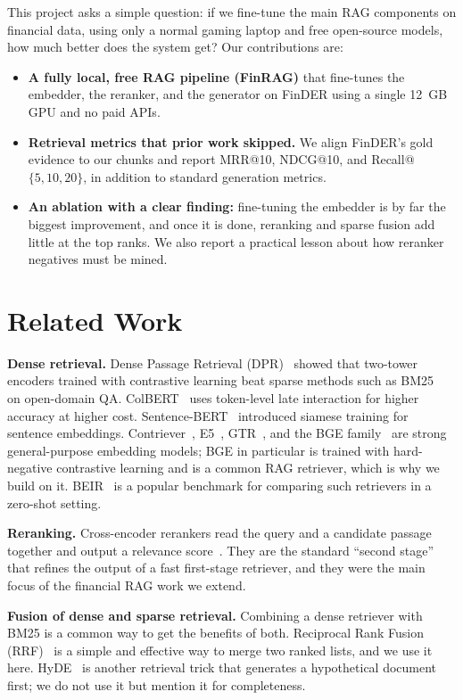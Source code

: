 \documentclass[conference]{IEEEtran}
\begin{document}
This project asks a simple question: if we fine-tune the main RAG components on financial data, using
only a normal gaming laptop and free open-source models, how much better does the system get? Our
contributions are:
\begin{itemize}
\item \textbf{A fully local, free RAG pipeline (FinRAG)} that fine-tunes the embedder, the reranker, and
the generator on FinDER using a single 12~GB GPU and no paid APIs.
\item \textbf{Retrieval metrics that prior work skipped.} We align FinDER's gold evidence to our chunks
and report MRR@10, NDCG@10, and Recall@$\{5,10,20\}$, in addition to standard generation metrics.
\item \textbf{An ablation with a clear finding:} fine-tuning the embedder is by far the biggest
improvement, and once it is done, reranking and sparse fusion add little at the top ranks. We also
report a practical lesson about how reranker negatives must be mined.
\end{itemize}

\section{Related Work}
\textbf{Dense retrieval.} Dense Passage Retrieval (DPR)~\cite{karpukhin2020dpr} showed that two-tower
encoders trained with contrastive learning beat sparse methods such as BM25~\cite{robertson2009bm25} on
open-domain QA. ColBERT~\cite{khattab2020colbert} uses token-level late interaction for higher accuracy
at higher cost. Sentence-BERT~\cite{reimers2019sbert} introduced siamese training for sentence
embeddings. Contriever~\cite{izacard2022contriever}, E5~\cite{wang2022e5}, GTR~\cite{ni2022gtr}, and the
BGE family~\cite{xiao2023bge} are strong general-purpose embedding models; BGE in particular is trained
with hard-negative contrastive learning and is a common RAG retriever, which is why we build on it.
BEIR~\cite{thakur2021beir} is a popular benchmark for comparing such retrievers in a zero-shot setting.

\textbf{Reranking.} Cross-encoder rerankers read the query and a candidate passage together and output a
relevance score~\cite{nogueira2019passage}. They are the standard ``second stage'' that refines the
output of a fast first-stage retriever, and they were the main focus of the financial RAG work we extend.

\textbf{Fusion of dense and sparse retrieval.} Combining a dense retriever with BM25 is a common way to
get the benefits of both. Reciprocal Rank Fusion (RRF)~\cite{cormack2009rrf} is a simple and effective
way to merge two ranked lists, and we use it here. HyDE~\cite{gao2022hyde} is another retrieval trick that
generates a hypothetical document first; we do not use it but mention it for completeness.
\end{document}
